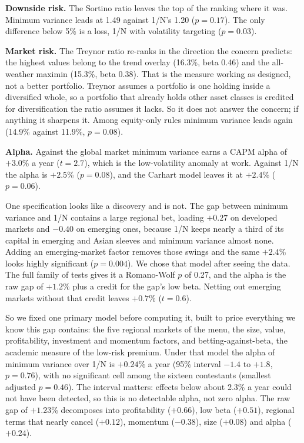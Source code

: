 \documentclass[12pt,letterpaper]{article}
\newenvironment{nuevotexto}{\par\color{nuevoc}}{\par}
\newcommand{\head}[1]{\noindent\textbf{#1}\hspace{0.5em}\ignorespaces}
\begin{document}
\begin{nuevotexto}
\head{Downside risk.} The Sortino ratio leaves the top of the ranking where it was. Minimum
variance leads at 1.49 against 1/N's 1.20 ($p = 0.17$). The only difference below 5\% is a
loss, 1/N with volatility targeting ($p = 0.03$).

\head{Market risk.} The Treynor ratio re-ranks in the direction the concern predicts: the highest
values belong to the trend overlay (16.3\%, beta 0.46) and the all-weather maximin (15.3\%, beta
0.38). That is the measure working as designed, not a better portfolio. Treynor assumes a portfolio
is one holding inside a diversified whole, so a portfolio that already holds other asset classes is
credited for diversification the ratio assumes it lacks. So it does not answer the concern; if
anything it sharpens it. Among equity-only rules minimum variance leads again (14.9\% against 11.9\%,
$p = 0.08$).

\head{Alpha.} Against the global market minimum variance earns a CAPM alpha of $+3.0$\% a year
($t = 2.7$), which is the low-volatility anomaly at work. Against 1/N the alpha is $+2.5$\% ($p = 0.08$), and
the Carhart model leaves it at $+2.4$\% ($p = 0.06$).

One specification looks like a discovery and is not. The gap between minimum variance and 1/N
contains a large regional bet, loading $+0.27$ on developed markets and $-0.40$ on emerging ones,
because 1/N keeps nearly a third of its capital in emerging and Asian sleeves and minimum variance
almost none. Adding an emerging-market factor removes those swings and the same $+2.4$\% looks highly
significant ($p = 0.004$). We chose that model after seeing the data. The full family of tests
gives it a Romano-Wolf $p$ of 0.27, and the alpha is the raw gap of $+1.2$\% plus a credit for the
gap's low beta. Netting out emerging markets without that credit leaves $+0.7$\% ($t = 0.6$).

So we fixed one primary model before computing it, built to price everything we know this gap
contains: the five regional markets of the menu, the size, value, profitability, investment and
momentum factors, and betting-against-beta, the academic measure of the low-risk premium. Under that
model the alpha of minimum variance over 1/N is $+0.24$\% a year (95\% interval $-1.4$ to $+1.8$,
$p = 0.76$), with no significant cell among the sixteen contestants (smallest adjusted $p = 0.46$). The
interval matters: effects below about 2.3\% a year could not have been detected, so this is no
detectable alpha, not zero alpha. The raw gap of $+1.23$\% decomposes into profitability
($+0.66$), low beta ($+0.51$), regional terms that nearly cancel ($+0.12$), momentum ($-0.38$), size
($+0.08$) and alpha ($+0.24$).
\end{nuevotexto}
\end{document}

